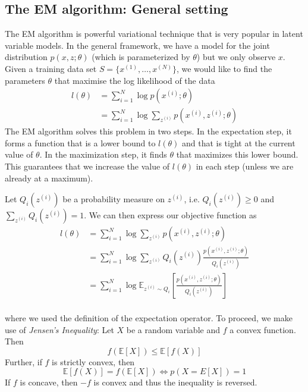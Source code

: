 \documentclass[final,3p,times,twocolumn]{elsarticle}
\begin{document}
\subsection{The EM algorithm: General setting}
The EM algorithm is powerful variational technique that is very popular in latent variable models.
In the general framework, we have a model for the joint distribution $p(x,z;\theta)$ (which is parameterized by $\theta$) but we only observe $x$.
Given a training data set $S=\{x^{(1)},\dots,x^{(N)}\}$, we would like to find the parameters $\theta$ that maximise the log likelihood of the data
\begin{equation}
\label{eqn:EMlikelihood}
\begin{split}
l(\theta) &= \sum_{i=1}^N \log p(x^{(i)};\theta)\\
&= \sum_{i=1}^N \log \sum_{z^{(i)}} p(x^{(i)},z^{(i)};\theta)
\end{split}
\end{equation}
The EM algorithm solves this problem in two steps.
In the expectation step, it forms a function that is a lower bound to $l(\theta)$ and that is tight at the current value of $\theta$.
In the maximization step, it finds $\theta$ that maximizes this lower bound.
This guarantees that we increase the value of $l(\theta)$ in each step (unless we are already at a maximum).

Let $Q_i(z^{(i)})$ be a probability measure on $z^{(i)}$, i.e. $Q_i(z^{(i)}) \geq 0$ and $\sum_{z^{(i)}} Q_i(z^{(i)}) = 1$. We can then express our objective function as
\begin{equation}
\begin{split}
l(\theta) &= \sum_{i=1}^N \log \sum_{z^{(i)}} p(x^{(i)},z^{(i)};\theta)\\
&= \sum_{i=1}^N \log \sum_{z^{(i)}} Q_i(z^{(i)}) \frac{p(x^{(i)},z^{(i)};\theta)}{Q_i(z^{(i)})}\\
&= \sum_{i=1}^N \log \mathbb{E}_{z^{(i)} \sim Q_i}\left[\frac{p(x^{(i)},z^{(i)};\theta)}{Q_i(z^{(i)})}\right]\\
\end{split}
\end{equation}

where we used the definition of the expectation operator. To proceed, we make use of \emph{Jensen's Inequality}: Let $X$ be a random variable and $f$ a convex function. Then
\begin{equation}
f(\mathbb{E}[X]) \leq \mathbb{E}[f(X)]
\label{eqn:jensen}
\end{equation}
Further, if $f$ is strictly convex, then 
\begin{equation}
\mathbb{E}[f(X)] = f(\mathbb{E}[X]) \iff p(X = E[X]) = 1
\label{eqn:jensentight}
\end{equation}
If $f$ is concave, then $-f$ is convex and thus the inequality is reversed.
\end{document}
